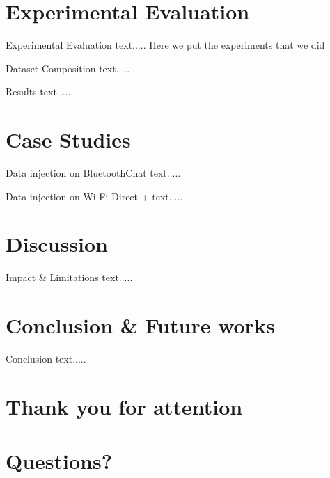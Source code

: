 \documentclass[10pt]{beamer}
\begin{document}
\section{Experimental Evaluation}
\begin{frame}[fragile]{Experimental Evaluation}
text..... Here we put the experiments that we did		
\end{frame}

\begin{frame}[fragile]{Dataset Composition}
text.....		
\end{frame}

\begin{frame}[fragile]{Results}
text.....		
\end{frame}

\section{Case Studies}
\begin{frame}[fragile]{Data injection on BluetoothChat}
text.....		
\end{frame}

\begin{frame}[fragile]{Data injection on Wi-Fi Direct +}
text.....		
\end{frame}


\section{Discussion}
\begin{frame}[fragile]{Impact \& Limitations}
text.....		
\end{frame}

\section{Conclusion \& Future works}
\begin{frame}[fragile]{Conclusion}
text.....		
\end{frame}

\section*{Thank you for attention}

\section*{Questions?}
\end{document}
